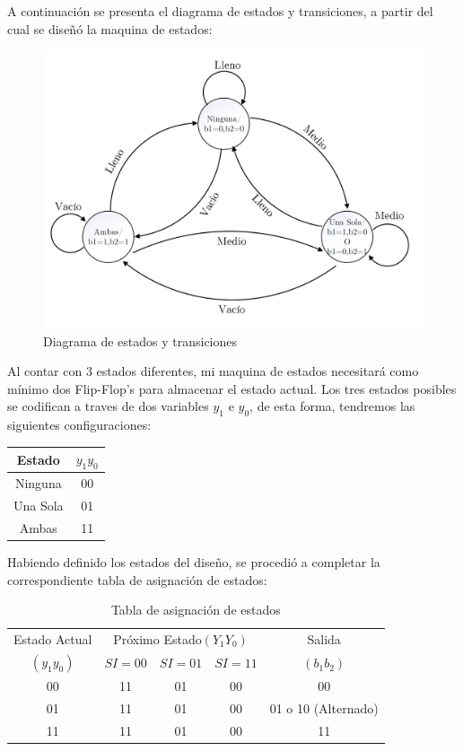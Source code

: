 \documentclass[10pt,a4paper]{article}
\begin{document}
A continuación se presenta el diagrama de estados y transiciones, a partir del cual se diseñó la maquina de estados:

\begin{figure}[H]
\centering
\includegraphics[scale=0.3]{images/diagrama_estados_moore.png}
\caption{Diagrama de estados y transiciones} \label{1_figa}
\end{figure}

Al contar con 3 estados diferentes, mi maquina de estados necesitará como mínimo dos Flip-Flop's para almacenar el estado actual. Los tres estados posibles se codifican a traves de dos variables $y_1$ e $y_0$, de esta forma, tendremos las siguientes configuraciones:

\bigskip

\begin{table}[ht]
	\centering
	\begin{tabular}{c|c}
	Estado & $y_1y_0$ \\ 
	\hline 
	Ninguna & 00 \\ 
	Una Sola & 01 \\ 
	Ambas & 11 \\ 
	\end{tabular} 
\end{table}


Habiendo definido los estados del diseño, se procedió a completar la correspondiente tabla de asignación de estados:
\bigskip
\begin{table}[ht]
	\centering
	\begin{tabular}{c|c|c|c|c}
	Estado Actual & \multicolumn{3}{c|}{Próximo Estado$(Y_1Y_0)$} & Salida\\
	\cline{2-4}
	$(y_1y_0)$ & $SI=00$ & $SI=01$ & $SI=11$ & $(b_1b_2)$\\
	\hline
	00 & 11 & 01 & 00 & 00 \\
	01 & 11 & 01 & 00 & 01 o 10 (Alternado) \\
	11 & 11 & 01 & 00 & 11 \\
	\end{tabular}
	\caption{Tabla de asignación de estados}
	\label{1_t1}
\end{table}
\end{document}

